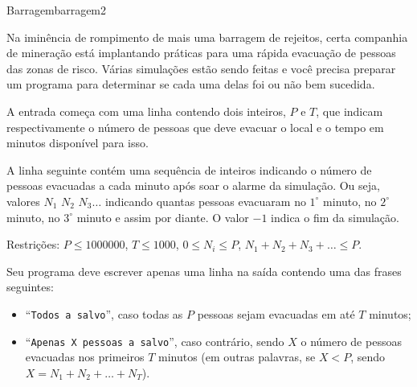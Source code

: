 \documentclass[12pt,a4paper,oneside]{article}
\begin{document}
\begin{problem}{Barragem}{barragem}{2}

Na iminência de rompimento de mais uma barragem de rejeitos, certa companhia de mineração está implantando práticas para uma rápida evacuação de pessoas das zonas de risco. Várias simulações estão sendo feitas e você precisa preparar um programa para determinar se cada uma delas foi ou não bem sucedida. 

%

\InputFile

A entrada começa com uma linha contendo dois inteiros, $P$ e $T$, que indicam respectivamente o número de pessoas que deve evacuar o local e o tempo em minutos disponível para isso.

A linha seguinte contém uma sequência de inteiros indicando o número de pessoas evacuadas a cada minuto após soar o alarme da simulação. Ou seja, valores $N_1$ $N_2$ $N_3\dots$ indicando quantas pessoas evacuaram no $1^{\circ}$ minuto, no $2^{\circ}$ minuto, no $3^{\circ}$ minuto e assim por diante. O valor $-1$ indica o fim da simulação.

Restrições: $P\leq1000000$, $T\leq 1000$, $0 \leq N_i \leq P$, $N_1 + N_2 + N_3 + \dots \leq P$.

\OutputFile

Seu programa deve escrever apenas uma linha na saída contendo uma das frases seguintes:

\begin{itemize}
    \item ``\texttt{Todos a salvo}'', caso todas as $P$ pessoas sejam evacuadas em até $T$ minutos;
    \item ``\texttt{Apenas X pessoas a salvo}'', caso contrário, sendo $X$ o número de pessoas evacuadas nos primeiros $T$ minutos (em outras palavras, se $X < P$, sendo $X = N_1+N_2+\dots+N_T$).
\end{itemize}


\Example

\begin{example}
%
\end{example}

\begin{example}
%
\end{example}

\begin{example}
%
\end{example}

\begin{example}
%
\end{example}

\begin{example}
%
\end{example}



\end{problem}
\end{document}
